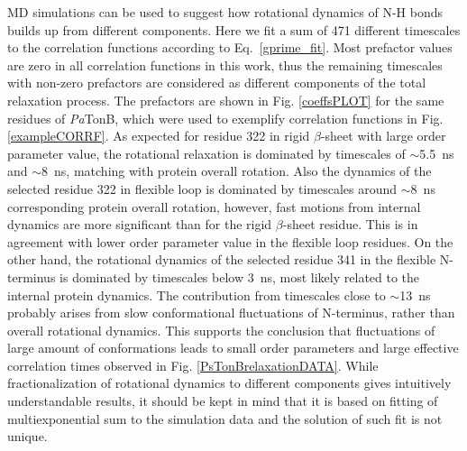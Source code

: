 \documentclass[pre,aps,floatfix,authordate1-4,twocolumn]{revtex4-1}
\begin{document}
MD simulations can be used to suggest how rotational dynamics of N-H bonds
builds up from different components. Here we fit a sum of 471 different
timescales to the correlation functions according to Eq.~\ref{gprime_fit}.
Most prefactor values are zero in all correlation functions in this work,
thus the remaining timescales with non-zero prefactors are considered as different
components of the total relaxation process.
The prefactors are shown in Fig. \ref{coeffsPLOT} for the same residues
of {\it Pa}TonB, which were used to exemplify correlation functions in Fig. \ref{exampleCORRF}.
As expected for residue 322 in rigid $\beta$-sheet with large order parameter value,
the rotational relaxation is dominated by timescales of $\sim$5.5~ns and $\sim$8~ns,
matching with protein overall
rotation. Also the dynamics of the selected residue 322 in flexible loop is
dominated by timescales around $\sim$8~ns corresponding protein overall rotation,
however, fast motions from internal dynamics are more significant than for the
rigid $\beta$-sheet residue. This is in agreement with lower order parameter value
in the flexible loop residues. On the other hand, the rotational dynamics of
the selected residue 341 in the flexible N-terminus is dominated by timescales
below 3~ns, most likely related to the internal protein dynamics.
The contribution from timescales close to $\sim$13~ns probably
arises from slow conformational fluctuations of N-terminus, rather than overall
rotational dynamics. This supports the conclusion that fluctuations of large amount of
conformations leads to small order parameters and large effective correlation times
observed in Fig. \ref{PsTonBrelaxationDATA}.
While fractionalization of rotational dynamics to different components
gives intuitively understandable results, it should be kept in mind that
it is based on fitting of multiexponential sum to the simulation data and the solution
of such fit is not unique.
\end{document}
